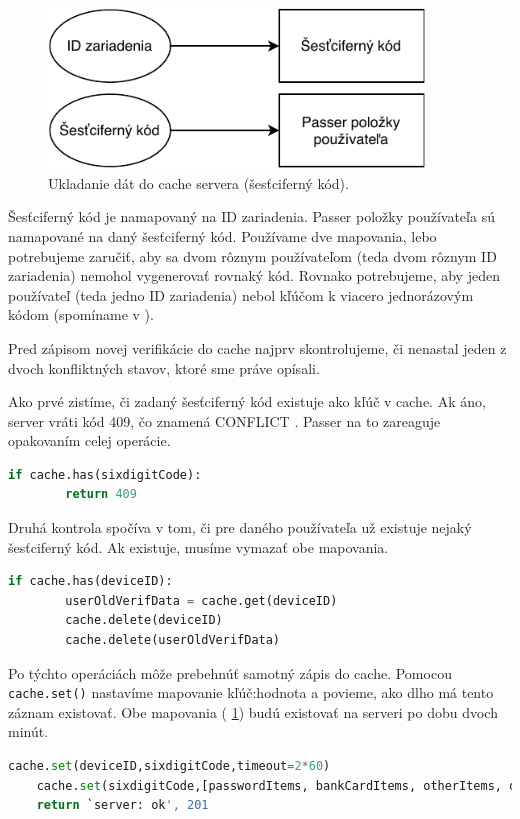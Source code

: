 \newline
\begin{figure}[H]
  \centering
  \includegraphics[width=10cm]{img/cache-diagram.pdf}
  \caption{Ukladanie dát do cache servera (šesťciferný kód).}
  \label{cache-diagram}
\end{figure}

Šesťciferný kód je namapovaný na ID zariadenia. Passer položky používateľa sú namapované na daný šesťciferný kód. Používame dve mapovania, lebo potrebujeme zaručiť, aby sa dvom rôznym používateľom (teda dvom rôznym ID zariadenia) nemohol vygenerovať rovnaký kód. Rovnako potrebujeme, aby jeden používateľ (teda jedno ID zariadenia) nebol kľúčom k viacero jednorázovým kódom (spomíname v ). 

Pred zápisom novej verifikácie do cache najprv skontrolujeme, či nenastal jeden z dvoch konfliktných stavov, ktoré sme práve opísali.

Ako prvé zistíme, či zadaný šesťciferný kód existuje ako kľúč v cache. Ak áno, server vráti kód 409, čo znamená CONFLICT \cite{http_response}. Passer na to zareaguje opakovaním celej operácie.
\begin{lstlisting}[language=Python, basicstyle=\small]
    if cache.has(sixdigitCode):
        return 409
\end{lstlisting}

Druhá kontrola spočíva v tom, či pre daného používateľa už existuje nejaký šesťciferný kód. Ak existuje, musíme vymazať obe mapovania. 
\begin{lstlisting}[language=Python, basicstyle=\small]
    if cache.has(deviceID):
        userOldVerifData = cache.get(deviceID)
        cache.delete(deviceID)
        cache.delete(userOldVerifData)
\end{lstlisting}

Po týchto operáciách môže prebehnúť samotný zápis do cache. Pomocou \texttt{cache.set()} nastavíme mapovanie kľúč:hodnota a povieme, ako dlho má tento záznam existovať. Obe mapovania (\figurename{ \ref{cache-diagram}})  budú existovať na serveri po dobu dvoch minút.
\newline
\begin{lstlisting}[language=Python, basicstyle=\small]
    cache.set(deviceID,sixdigitCode,timeout=2*60)
    cache.set(sixdigitCode,[passwordItems, bankCardItems, otherItems, deviceID],timeout=2*60)
    return `server: ok', 201
\end{lstlisting}

